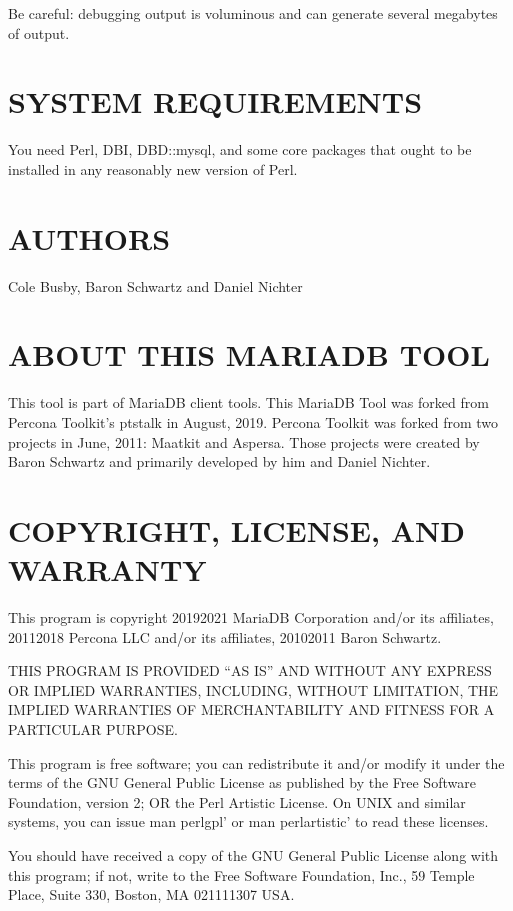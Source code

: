 \documentclass[letterpaper,10pt,english]{sphinxmanual}
\begin{document}
Be careful: debugging output is voluminous and can generate several megabytes
of output.


\section{SYSTEM REQUIREMENTS}
\label{\detokenize{mariadb-kill:system-requirements}}
You need Perl, DBI, DBD::mysql, and some core packages that ought to be
installed in any reasonably new version of Perl.


\section{AUTHORS}
\label{\detokenize{mariadb-kill:authors}}
Cole Busby, Baron Schwartz and Daniel Nichter


\section{ABOUT THIS MARIADB TOOL}
\label{\detokenize{mariadb-kill:about-this-mariadb-tool}}
This tool is part of MariaDB client tools. This MariaDB Tool was forked from
Percona Toolkit’s pt\sphinxhyphen{}stalk in August, 2019. Percona Toolkit was forked from two
projects in June, 2011: Maatkit and Aspersa.  Those projects were created by
Baron Schwartz and primarily developed by him and Daniel Nichter.


\section{COPYRIGHT, LICENSE, AND WARRANTY}
\label{\detokenize{mariadb-kill:copyright-license-and-warranty}}
This program is copyright 2019\sphinxhyphen{}2021 MariaDB Corporation and/or its affiliates,
2011\sphinxhyphen{}2018 Percona LLC and/or its affiliates, 2010\sphinxhyphen{}2011 Baron Schwartz.

THIS PROGRAM IS PROVIDED “AS IS” AND WITHOUT ANY EXPRESS OR IMPLIED
WARRANTIES, INCLUDING, WITHOUT LIMITATION, THE IMPLIED WARRANTIES OF
MERCHANTABILITY AND FITNESS FOR A PARTICULAR PURPOSE.

This program is free software; you can redistribute it and/or modify it under
the terms of the GNU General Public License as published by the Free Software
Foundation, version 2; OR the Perl Artistic License.  On UNIX and similar
systems, you can issue \textasciigrave{}man perlgpl’ or \textasciigrave{}man perlartistic’ to read these
licenses.

You should have received a copy of the GNU General Public License along with
this program; if not, write to the Free Software Foundation, Inc., 59 Temple
Place, Suite 330, Boston, MA  02111\sphinxhyphen{}1307  USA.
\end{document}
